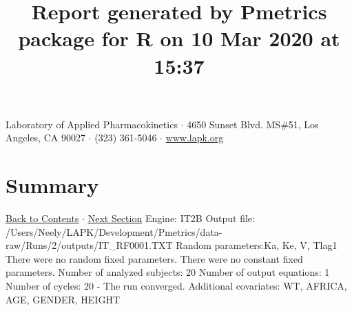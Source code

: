 \documentclass{article}
\title{Report generated by Pmetrics package for R on 10 Mar 2020 at 15:37 }
\date{}
\begin{document}
              \maketitle 
Laboratory of Applied Pharmacokinetics $\cdot$ 4650 Sunset Blvd. MS\#51, Los Angeles, CA 90027 $\cdot$ (323) 361-5046 $\cdot$ \href{http://www.lapk.org}{www.lapk.org} 
\hypertarget{tableofcontents}{}
        \tableofcontents
        \newpage 
\section{Summary} \hyperlink{tableofcontents}{Back to Contents} $\cdot$ \hyperlink{cycleinfo}{Next Section}\newline
 \newline 
Engine: IT2B\newline 
Output file: /Users/Neely/LAPK/Development/Pmetrics/data-raw/Runs/2/outputs/IT\_RF0001.TXT\newline 
Random parameters:Ka, Ke, V, Tlag1\newline 
There were no random fixed parameters. \newline 
There were no constant fixed parameters. \newline 
Number of analyzed subjects:  20 \newline 
Number of output equations:  1 \newline 
Number of cycles:  20     - The run converged. \newline 
Additional covariates:  WT, AFRICA, AGE, GENDER, HEIGHT \newline 
 \newline 
\newpage
            \hypertarget{cycleinfo}{}
            
\end{document}
